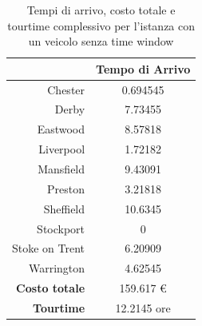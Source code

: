 
		\begin{table}[H]
			\small
			\centering
			\label{table:instance_1_arrival}
			\begin{tabular}{rc}

				\toprule
				& Tempo di Arrivo \\

				\midrule
				Chester & 0.694545 \\
				Derby & 7.73455 \\
				Eastwood & 8.57818 \\
				Liverpool & 1.72182 \\
				Mansfield & 9.43091 \\
				Preston & 3.21818 \\
				Sheffield & 10.6345 \\
				Stockport  & 0 \\
				Stoke on Trent & 6.20909 \\
				Warrington & 4.62545 \\
				\midrule
				\textbf{Costo totale} & 159.617 € \\
				\textbf{Tourtime} & 12.2145 ore \\
				\bottomrule
			\end{tabular}
			\label{table:instance_1_totale}
			\caption{Tempi di arrivo, costo totale e tourtime complessivo per l'istanza con un veicolo senza time window}
		\end{table}

